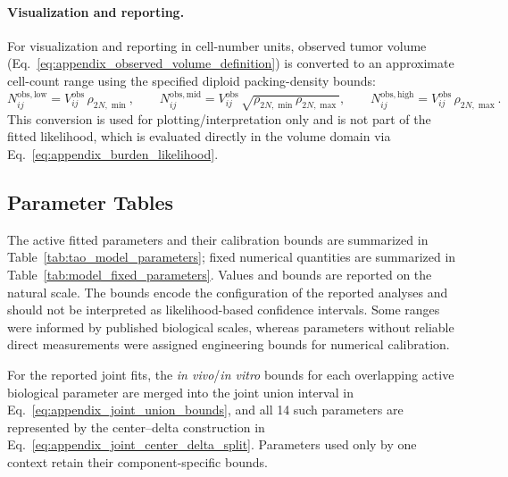 \documentclass[11pt]{article}
\begin{document}
\paragraph{Visualization and reporting.}

For visualization and reporting in cell-number units, observed tumor volume (Eq.~\eqref{eq:appendix_observed_volume_definition}) is converted to an approximate cell-count range using the specified diploid packing-density bounds:
\begin{equation}
N^{\mathrm{obs,low}}_{ij}
=
V^{\mathrm{obs}}_{ij}\,\rho_{2N,\min},
\qquad
N^{\mathrm{obs,mid}}_{ij}
=
V^{\mathrm{obs}}_{ij}\,\sqrt{\rho_{2N,\min}\rho_{2N,\max}},
\qquad
N^{\mathrm{obs,high}}_{ij}
=
V^{\mathrm{obs}}_{ij}\,\rho_{2N,\max}.
\label{eq:appendix_obs_volume_to_cells}
\end{equation}
This conversion is used for plotting/interpretation only and is not part of the fitted likelihood, which is evaluated directly in the volume domain via Eq.~\eqref{eq:appendix_burden_likelihood}.

\subsection{Parameter Tables}

The active fitted parameters and their calibration bounds are summarized in Table~\ref{tab:tao_model_parameters}; fixed numerical quantities are summarized in Table~\ref{tab:model_fixed_parameters}. Values and bounds are reported on the natural scale. The bounds encode the configuration of the reported analyses and should not be interpreted as likelihood-based confidence intervals. Some ranges were informed by published biological scales, whereas parameters without reliable direct measurements were assigned engineering bounds for numerical calibration.

For the reported joint fits, the \textit{in vivo}/\textit{in vitro} bounds for each overlapping active biological parameter are merged into the joint union interval in Eq.~\eqref{eq:appendix_joint_union_bounds}, and all 14 such parameters are represented by the center--delta construction in Eq.~\eqref{eq:appendix_joint_center_delta_split}. Parameters used only by one context retain their component-specific bounds.


\clearpage



\clearpage



\clearpage



\end{document}
